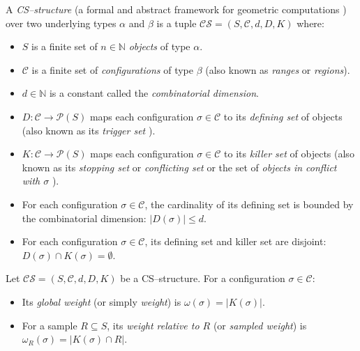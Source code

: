 \begin{definition}[CS--structure]
\label{def:CS_structure}
\uses{}
A \emph{CS--structure} (a formal and abstract framework for geometric computations \cite{Clarkson89}) over two underlying types $\alpha$ and $\beta$ is a tuple $\mathcal{CS} = (S, \mathcal{C}, d, D, K)$ where:
\begin{itemize}
    \item $S$ is a finite set of $n \in \mathbb{N}$ \emph{objects} of type $\alpha$.
    \item $\mathcal{C}$ is a finite set of \emph{configurations} of type $\beta$ (also known as \emph{ranges} or \emph{regions}).
    \item $d \in \mathbb{N}$ is a constant called the \emph{combinatorial dimension}.
    \item $D : \mathcal{C} \to \mathcal{P}(S)$ maps each configuration $\sigma \in \mathcal{C}$ to its \emph{defining set} of objects (also known as its \emph{trigger set} \cite{Mulmuley94}).
    \item $K : \mathcal{C} \to \mathcal{P}(S)$ maps each configuration $\sigma \in \mathcal{C}$ to its \emph{killer set} of objects (also known as its \emph{stopping set} \cite{Mulmuley94} or \emph{conflicting set} \cite{HarPeled11} or the set of \emph{objects in conflict with $\sigma$} \cite{Sharir03, Bae25}).
    \item For each configuration $\sigma \in \mathcal{C}$, the cardinality of its defining set is bounded by the combinatorial dimension: $|D(\sigma)| \le d$.
    \item For each configuration $\sigma \in \mathcal{C}$, its defining set and killer set are disjoint: $D(\sigma) \cap K(\sigma) = \emptyset$.
\end{itemize}
\end{definition}

\begin{definition}
\label{def:weights}
Let $\mathcal{CS} = (S, \mathcal{C}, d, D, K)$ be a CS--structure. For a configuration $\sigma \in \mathcal{C}$:
\begin{itemize}
    \item Its \emph{global weight} (or simply \emph{weight}) is $\omega(\sigma) = |K(\sigma)|$.
    \item For a sample $R \subseteq S$, its \emph{weight relative to $R$} (or \emph{sampled weight}) is $\omega_R(\sigma) = |K(\sigma) \cap R|$.
\end{itemize}
\end{definition}

